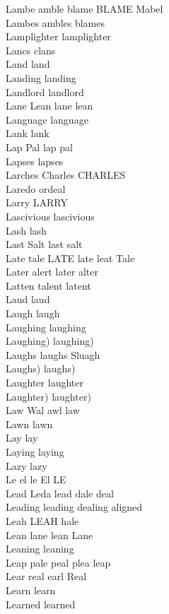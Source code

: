 Lambe amble blame BLAME Mabel\\
Lambes ambles blames\\
Lamplighter lamplighter\\
Lancs clans\\
Land land\\
Landing landing\\
Landlord landlord\\
Lane Lean lane lean\\
Language language\\
Lank lank\\
Lap Pal lap pal\\
Lapses lapses\\
Larches Charles CHARLES\\
Laredo ordeal\\
Larry LARRY\\
Lascivious lascivious\\
Lash lash\\
Last Salt last salt\\
Late tale LATE late leat Tale\\
Later alert later alter\\
Latten talent latent\\
Laud laud\\
Laugh laugh\\
Laughing laughing\\
Laughing) laughing)\\
Laughs laughs Sluagh\\
Laughs) laughs)\\
Laughter laughter\\
Laughter) laughter)\\
Law Wal awl law\\
Lawn lawn\\
Lay lay\\
Laying laying\\
Lazy lazy\\
Le el le El LE\\
Lead Leda lead dale deal\\
Leading leading dealing aligned\\
Leah LEAH hale\\
Lean lane lean Lane\\
Leaning leaning\\
Leap pale peal plea leap\\
Lear real earl Real\\
Learn learn\\
Learned learned\\
